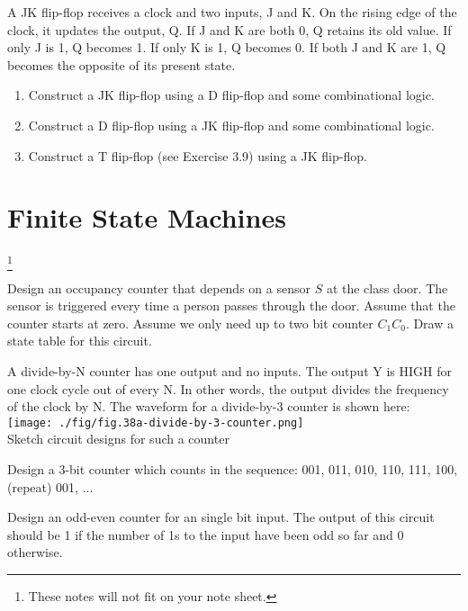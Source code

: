 \begin{prob}
  A JK flip-flop receives a clock and two inputs, J and K. On the rising
  edge of the clock, it updates the output, Q. If J and K are both 0, Q retains its old
  value. If only J is 1, Q becomes 1. If only K is 1, Q becomes 0. If both J and K are 1,
  Q becomes the opposite of its present state.
  \begin{enumerate}
  \item Construct a JK flip-flop using a D flip-flop and some combinational logic.
  \item Construct a D flip-flop using a JK flip-flop and some combinational logic.
  \item Construct a T flip-flop (see Exercise 3.9) using a JK flip-flop.
  \end{enumerate}
\end{prob}


\section{Finite State Machines~\cite[Sec~3.4]{harris2022digital}}\footnote{These
  notes will not fit on your note sheet.}

\begin{example}
  Design an occupancy counter that depends on a
  sensor $S$ at the class door. The sensor is triggered every time a person passes
  through the door. Assume that the counter starts at zero. Assume
  we only need up to two bit counter $C_1C_0$. Draw a state table for this
  circuit.
\end{example}

\begin{prob}
  A divide-by-N counter has one output and no inputs. The output Y is HIGH for
  one clock cycle out of every N. In other words, the output divides the frequency
  of the clock by N. The waveform for a divide-by-3 counter is shown here:\\
  \texttt{[image: ./fig/fig.38a-divide-by-3-counter.png]}\\
  Sketch circuit designs for such a counter
\end{prob}

\begin{prob}
  Design a 3-bit counter which counts in the sequence:
  001, 011, 010, 110, 111, 100, (repeat) 001, ...
\end{prob}

\begin{example}
  Design an odd-even counter for an single bit input. The output of this circuit
  should be 1 if the number of 1s to the input have been odd so far and 0
  otherwise.
\end{example}

